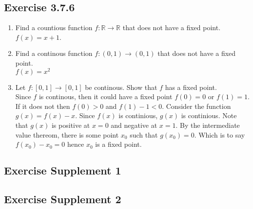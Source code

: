 \documentclass{tufte-book}
\theoremstyle{mytheoremstyle}
\theoremstyle{mylemstyle}
\theoremstyle{mydefstyle}
\begin{document}
\subsection{Exercise 3.7.6}
\begin{enumerate}
\item Find a countious function $f: \mathbb{R} \to \mathbb{R}$ that does not have a fixed point.\\
$f(x) = x+1$.

\item Find a continous function $f:(0,1) \to (0,1)$ that does not have a fixed point.\\
$f(x) = x^2$

\item Let $f:[0,1] \to [0,1]$ be continous.  Show that $f$ has a fixed point.\\

Since $f$ is continous, then it could have a fixed point $f(0) = 0$ or $f(1) = 1$.  If it does not then $f(0) > 0$ and $f(1)-1 < 0$.  Consider the function $g(x) = f(x) - x$.  Since $f(x)$ is continious, $g(x)$ is continious.  Note that $g(x)$ is positive at $x = 0$ and negative at $x  =1$.  By the intermediate value thereom, there is some point $x_0$ such that $g(x_0) = 0$.  Which is to say $f(x_0) - x_0 = 0$ hence $x_0$ is a fixed point.
\end{enumerate}
\subsection{Exercise Supplement 1}

\subsection{Exercise Supplement 2}
\end{document}
